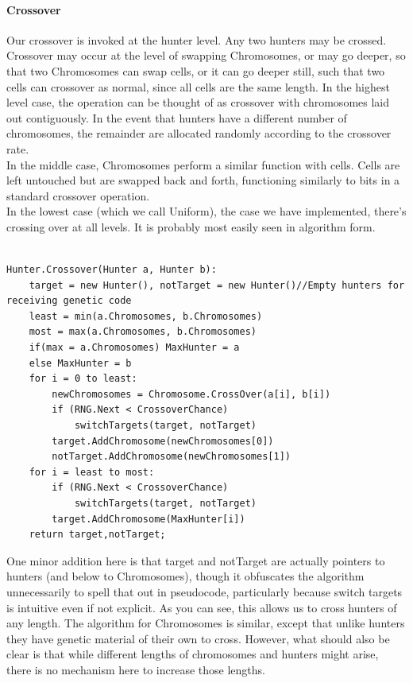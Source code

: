 \paragraph{Crossover}
Our crossover is invoked at the hunter level.  Any two hunters may be crossed.  Crossover may occur at the level of swapping Chromosomes, or may go deeper, so that two Chromosomes can swap cells, or it can go deeper still, such that two cells can crossover as normal, since all cells are the same length.  
In the highest level case, the operation can be thought of as crossover with chromosomes laid out contiguously.  In the event that hunters have a different number of chromosomes, the remainder are allocated randomly according to the crossover rate.\\
In the middle case, Chromosomes perform a similar function with cells.  Cells are left untouched but are swapped back and forth, functioning similarly to bits in a standard crossover operation.  \\
In the lowest case (which we call Uniform), the case we have implemented, there's crossing over at all levels. It is probably most easily seen in algorithm form.\\\\
\begin{lstlisting}[language = algorithm, caption={Hunter Crossover}, label={fig:HunterXover}]
Hunter.Crossover(Hunter a, Hunter b):
	target = new Hunter(), notTarget = new Hunter()//Empty hunters for receiving genetic code
	least = min(a.Chromosomes, b.Chromosomes)
	most = max(a.Chromosomes, b.Chromosomes)
	if(max = a.Chromosomes) MaxHunter = a
	else MaxHunter = b
	for i = 0 to least:
		newChromosomes = Chromosome.CrossOver(a[i], b[i])
		if (RNG.Next < CrossoverChance)
			switchTargets(target, notTarget)
		target.AddChromosome(newChromosomes[0])
		notTarget.AddChromosome(newChromosomes[1])
	for i = least to most:
		if (RNG.Next < CrossoverChance) 
			switchTargets(target, notTarget)	
		target.AddChromosome(MaxHunter[i])
	return target,notTarget;
\end{lstlisting}
One minor addition here is that target and notTarget are actually pointers to hunters (and below to Chromosomes), though it obfuscates the algorithm unnecessarily to spell that out in pseudocode, particularly because switch targets is intuitive even if not explicit.  
As you can see, this allows us to cross hunters of any length.  The algorithm for Chromosomes is similar, except that unlike hunters they have genetic material of their own to cross.  However, what should also be clear is that while different lengths of chromosomes and hunters might arise, there is no mechanism here to increase those lengths.

